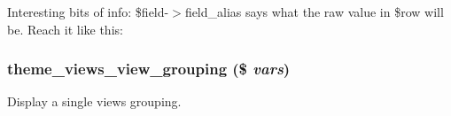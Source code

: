 Interesting bits of info: \$field-\/$>$field\_\-alias says what the raw value in \$row will be. Reach it like this: 
\begin{DoxyCode}
 { $row->{$field->field_alias} 
\end{DoxyCode}
 \hypertarget{views_2theme_2theme_8inc_ad940f51fabee918aa8e62942c83c12ee}{
\subsubsection[{theme\_\-views\_\-view\_\-grouping}]{\setlength{\rightskip}{0pt plus 5cm}theme\_\-views\_\-view\_\-grouping (\$ {\em vars})}}
\label{views_2theme_2theme_8inc_ad940f51fabee918aa8e62942c83c12ee}
Display a single views grouping. 